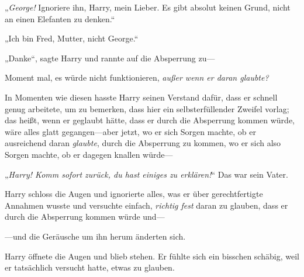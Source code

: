 „\emph{George!} Ignoriere ihn, Harry, mein Lieber. Es gibt absolut keinen Grund, nicht an einen Elefanten zu denken.“

„Ich bin Fred, Mutter, nicht George.“

„Danke“, sagte Harry und rannte auf die Absperrung zu—

Moment mal, es würde nicht funktionieren, \emph{außer wenn er daran glaubte?}

In Momenten wie diesen hasste Harry seinen Verstand dafür, dass er schnell genug arbeitete, um zu bemerken, dass hier ein selbsterfüllender Zweifel vorlag; das heißt, wenn er geglaubt hätte, dass er durch die Absperrung kommen würde, wäre alles glatt gegangen—aber jetzt, wo er sich Sorgen machte, ob er ausreichend daran \emph{glaubte}, durch die Absperrung zu kommen, wo er sich also Sorgen machte, ob er dagegen knallen würde—

„\emph{Harry! Komm sofort zurück, du hast einiges zu erklären!}“ Das war sein Vater.

Harry schloss die Augen und ignorierte alles, was er über gerechtfertigte Annahmen wusste und versuchte einfach, \emph{richtig fest} daran zu glauben, dass er durch die Absperrung kommen würde und—

—und die Geräusche um ihn herum änderten sich.

Harry öffnete die Augen und blieb stehen. Er fühlte sich ein bisschen schäbig, weil er tatsächlich versucht hatte, etwas zu glauben.

